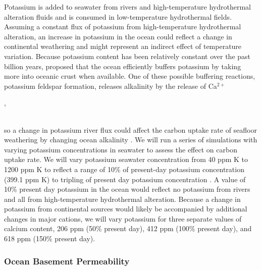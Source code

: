 \documentclass[authoryear,round,12pt]{article}
\begin{document}
Potassium is added to seawater from rivers and high-temperature
hydrothermal alteration fluids and is consumed in low-temperature
hydrothermal fields. Assuming a constant flux of potassium from
high-temperature hydrothermal alteration, an increase in potassium in
the ocean could reflect a change in continental weathering and might
represent an indirect effect of temperature variation. Because
potassium content has been relatively constant over the past billion
years, \citet{demicco2005} proposed that the ocean efficiently buffers
potassium by taking more into oceanic crust when available. One of
these possible buffering reactions, potassium feldspar formation,
releases alkalinity by the release of Ca$^{2+}$
\\

\begin{small}
,
\end{small}
\\

so a change in potassium river flux could affect the carbon uptake
rate of seafloor weathering by changing ocean alkalinity
\citep{coogan2013}. We will run a series of simulations
with varying potassium concentrations in seawater to assess the effect
on carbon uptake rate. We will vary potassium seawater concentration
from 40 ppm K to 1200 ppm K to reflect a range of 10\% of present-day
potassium concentration (399.1 ppm K) to tripling of present day
potassium concentration \citep{nordstrom1979}. A value of 10\% present
day potassium in the ocean would reflect no potassium from rivers and
all from high-temperature hydrothermal alteration. Because a change in
potassium from continental sources would likely be accompanied by
additional changes in major cations, we will vary potassium for
three separate values of calcium content, 206 ppm (50\% present day),
412 ppm (100\% present day), and 618 ppm (150\% present day).

\subsubsection{Ocean Basement Permeability}
\end{document}
